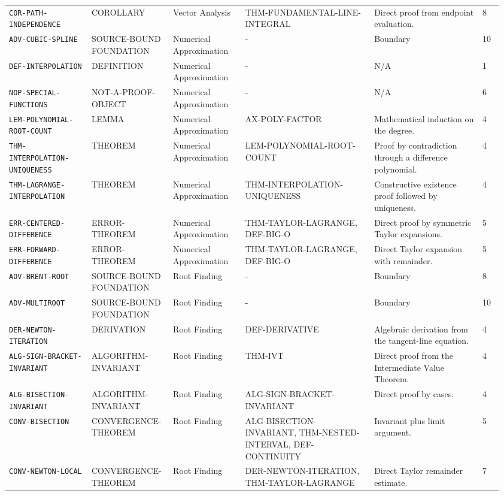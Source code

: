 \documentclass[10pt]{article}
\newcommand{\pidraw}[1]{\begingroup\urlstyle{tt}\nolinkurl{#1}\endgroup}
\theoremstyle{definition}
\theoremstyle{remark}
\begin{document}
\begin{landscape}
\begin{longtable}{@{}L{0.16\linewidth}L{0.15\linewidth}L{0.14\linewidth}L{0.25\linewidth}L{0.218\linewidth}C{0.04\linewidth}@{}}
\pidraw{COR-PATH-INDEPENDENCE} & COROLLARY & Vector Analysis & THM-FUNDAMENTAL-LINE-INTEGRAL & Direct proof from endpoint evaluation. & 8 \\
\pidraw{ADV-CUBIC-SPLINE} & SOURCE-BOUND FOUNDATION & Numerical Approximation & - & Boundary & 10 \\
\pidraw{DEF-INTERPOLATION} & DEFINITION & Numerical Approximation & - & N/A & 1 \\
\pidraw{NOP-SPECIAL-FUNCTIONS} & NOT-A-PROOF-OBJECT & Numerical Approximation & - & N/A & 6 \\
\pidraw{LEM-POLYNOMIAL-ROOT-COUNT} & LEMMA & Numerical Approximation & AX-POLY-FACTOR & Mathematical induction on the degree. & 4 \\
\pidraw{THM-INTERPOLATION-UNIQUENESS} & THEOREM & Numerical Approximation & LEM-POLYNOMIAL-ROOT-COUNT & Proof by contradiction through a difference polynomial. & 4 \\
\pidraw{THM-LAGRANGE-INTERPOLATION} & THEOREM & Numerical Approximation & THM-INTERPOLATION-UNIQUENESS & Constructive existence proof followed by uniqueness. & 4 \\
\pidraw{ERR-CENTERED-DIFFERENCE} & ERROR-THEOREM & Numerical Approximation & THM-TAYLOR-LAGRANGE, DEF-BIG-O & Direct proof by symmetric Taylor expansions. & 5 \\
\pidraw{ERR-FORWARD-DIFFERENCE} & ERROR-THEOREM & Numerical Approximation & THM-TAYLOR-LAGRANGE, DEF-BIG-O & Direct Taylor expansion with remainder. & 5 \\
\pidraw{ADV-BRENT-ROOT} & SOURCE-BOUND FOUNDATION & Root Finding & - & Boundary & 8 \\
\pidraw{ADV-MULTIROOT} & SOURCE-BOUND FOUNDATION & Root Finding & - & Boundary & 10 \\
\pidraw{DER-NEWTON-ITERATION} & DERIVATION & Root Finding & DEF-DERIVATIVE & Algebraic derivation from the tangent-line equation. & 4 \\
\pidraw{ALG-SIGN-BRACKET-INVARIANT} & ALGORITHM-INVARIANT & Root Finding & THM-IVT & Direct proof from the Intermediate Value Theorem. & 4 \\
\pidraw{ALG-BISECTION-INVARIANT} & ALGORITHM-INVARIANT & Root Finding & ALG-SIGN-BRACKET-INVARIANT & Direct proof by cases. & 4 \\
\pidraw{CONV-BISECTION} & CONVERGENCE-THEOREM & Root Finding & ALG-BISECTION-INVARIANT, THM-NESTED-INTERVAL, DEF-CONTINUITY & Invariant plus limit argument. & 5 \\
\pidraw{CONV-NEWTON-LOCAL} & CONVERGENCE-THEOREM & Root Finding & DER-NEWTON-ITERATION, THM-TAYLOR-LAGRANGE & Direct Taylor remainder estimate. & 7 \\

\end{longtable}
\end{landscape}
\end{document}
